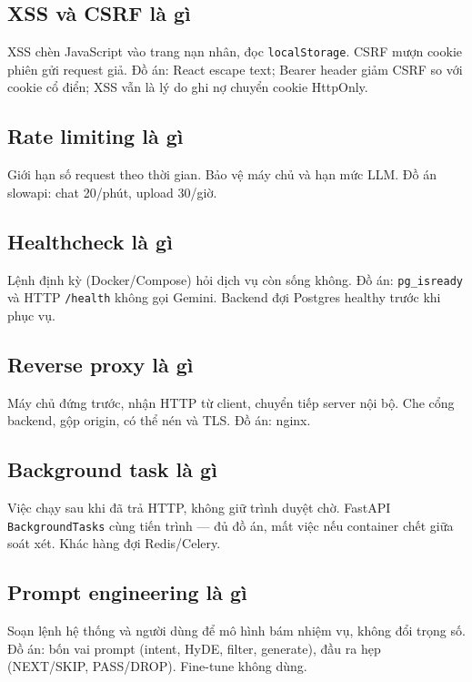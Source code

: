 \subsection{XSS và CSRF là gì}

XSS chèn JavaScript vào trang nạn nhân, đọc \texttt{localStorage}. CSRF mượn
cookie phiên gửi request giả. Đồ án: React escape text; Bearer header giảm CSRF
so với cookie cổ điển; XSS vẫn là lý do ghi nợ chuyển cookie HttpOnly.

\subsection{Rate limiting là gì}

Giới hạn số request theo thời gian. Bảo vệ máy chủ và hạn mức LLM. Đồ án
slowapi: chat 20/phút, upload 30/giờ.

\subsection{Healthcheck là gì}

Lệnh định kỳ (Docker/Compose) hỏi dịch vụ còn sống không. Đồ án:
\texttt{pg\_isready} và HTTP \texttt{/health} không gọi Gemini. Backend đợi
Postgres healthy trước khi phục vụ.

\subsection{Reverse proxy là gì}

Máy chủ đứng trước, nhận HTTP từ client, chuyển tiếp server nội bộ. Che cổng
backend, gộp origin, có thể nén và TLS. Đồ án: nginx.

\subsection{Background task là gì}

Việc chạy sau khi đã trả HTTP, không giữ trình duyệt chờ. FastAPI
\texttt{BackgroundTasks} cùng tiến trình --- đủ đồ án, mất việc nếu container
chết giữa soát xét. Khác hàng đợi Redis/Celery.

\subsection{Prompt engineering là gì}

Soạn lệnh hệ thống và người dùng để mô hình bám nhiệm vụ, không đổi trọng số.
Đồ án: bốn vai prompt (intent, HyDE, filter, generate), đầu ra hẹp
(NEXT/SKIP, PASS/DROP). Fine-tune không dùng.

